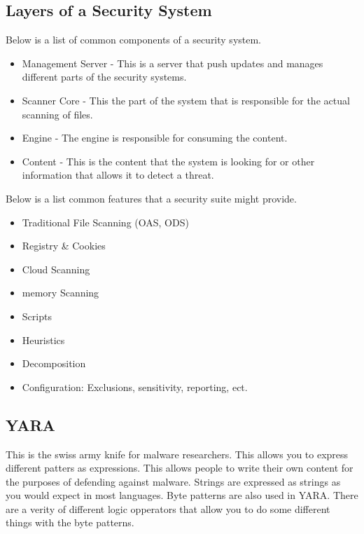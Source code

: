 \documentclass[letterpaper, onecolumn,10pt]{IEEEtran}
\begin{document}
            \subsection{Layers of a Security System}
            Below is a list of common components of a security system.
            \begin{itemize}
                \item Management Server - This is a server that push updates and manages different parts of the security systems.\\
                \item Scanner Core - This the part of the system that is responsible for the actual scanning of files.\\
                \item Engine - The engine is responsible for consuming the content.\\
                \item Content - This is the content that the system is looking for or other information that allows it to detect a threat.\\
            \end{itemize}
            
            Below is a list common features that a security suite might provide.
            \begin{itemize}
                \item Traditional File Scanning (OAS, ODS)\\
                \item Registry & Cookies\\
                \item Cloud Scanning\\
                \item memory Scanning\\
                \item Scripts\\
                \item Heuristics\\
                \item Decomposition\\
                \item Configuration: Exclusions, sensitivity, reporting, ect.\\
            \end{itemize}
            
            \subsection{YARA}
            This is the swiss army knife for malware researchers. This allows you to express different patters as expressions. This allows people to write their own content for the purposes of defending against malware. Strings are expressed as strings as you would expect in most languages. Byte patterns are also used in YARA. There are a verity of different logic opperators that allow you to do some different things with the byte patterns.\\
             
\end{document}
